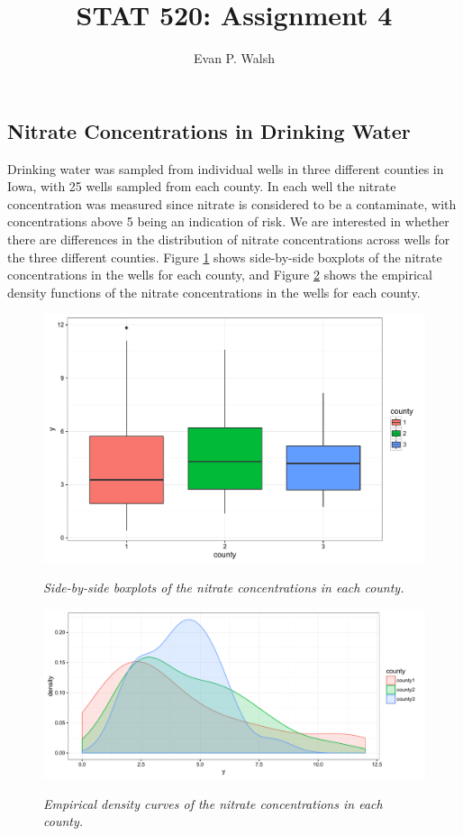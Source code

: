 \documentclass[12pt]{article}
\title{STAT 520: Assignment 4}
\author{Evan P. Walsh}
\begin{document}

\subsection*{Nitrate Concentrations in Drinking Water}

Drinking water was sampled from individual wells in three different counties in Iowa, with 25 wells sampled from each county. In each well the nitrate
concentration was measured since nitrate is considered to be a contaminate, with concentrations above 5 being an indication of risk.
We are interested in whether there are differences in the distribution of nitrate concentrations across wells for the three different counties.
Figure \ref{boxplot} shows side-by-side boxplots of the nitrate concentrations in the wells for each county, and Figure \ref{density} shows the empirical density
functions of the nitrate concentrations in the wells for each county.

\begin{figure}[h]
  \caption{\emph{Side-by-side boxplots of the nitrate concentrations in each county.}}
  \centering
  \includegraphics[width=.7\textwidth]{./figures/hw04_boxplots.pdf}
  \label{boxplot}
\end{figure}

\begin{figure}[h]
  \caption{\emph{Empirical density curves of the nitrate concentrations in each county.}}
  \centering
  \includegraphics[width=.9\textwidth]{./figures/hw04_density.pdf}
  \label{density}
\end{figure}
\end{document}
